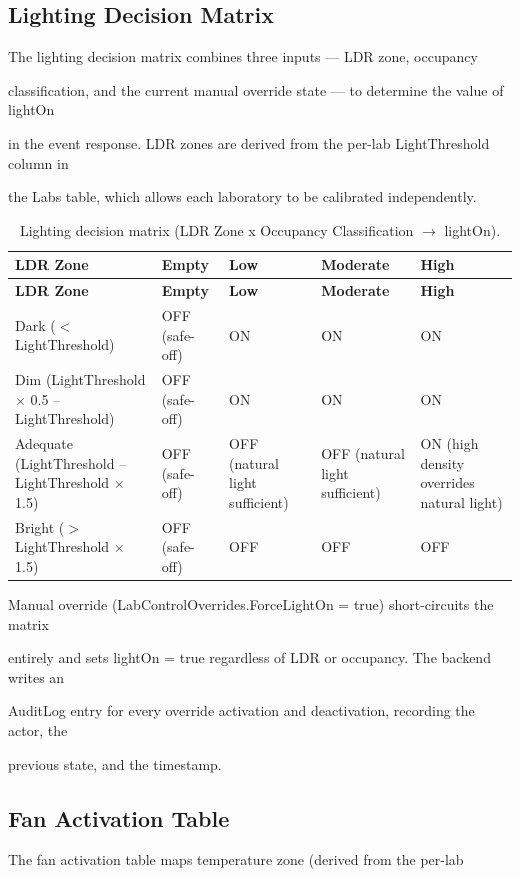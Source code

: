 \subsection{Lighting Decision Matrix}
The lighting decision matrix combines three inputs --- LDR zone, occupancy

classification, and the current manual override state --- to determine the value of lightOn

in the event response. LDR zones are derived from the per-lab LightThreshold column in

the Labs table, which allows each laboratory to be calibrated independently.

\begin{longtable}{|L{2.6cm}|L{2.0cm}|L{2.0cm}|L{2.0cm}|L{2.0cm}|}
\caption{Lighting decision matrix (LDR Zone x Occupancy Classification $\rightarrow$ lightOn).} \label{tab:4-6} \\
\hline
{}
\textbf{LDR Zone} & \textbf{Empty} & \textbf{Low} & \textbf{Moderate} & \textbf{High} \\
\hline
\endfirsthead
\hline
{}
\textbf{LDR Zone} & \textbf{Empty} & \textbf{Low} & \textbf{Moderate} & \textbf{High} \\
\hline
\endhead
\hline
\endfoot
\hline
\endlastfoot
Dark ($<$ LightThreshold) & OFF (safe-off) & ON & ON & ON \\
\hline
Dim (LightThreshold $\times$ 0.5 -- LightThreshold) & OFF (safe-off) & ON & ON & ON \\
\hline
Adequate (LightThreshold -- LightThreshold $\times$ 1.5) & OFF (safe-off) & OFF (natural light sufficient) & OFF (natural light sufficient) & ON (high density overrides natural light) \\
\hline
Bright ($>$ LightThreshold $\times$ 1.5) & OFF (safe-off) & OFF & OFF & OFF \\
\hline
\end{longtable}

Manual override (LabControlOverrides.ForceLightOn = true) short-circuits the matrix

entirely and sets lightOn = true regardless of LDR or occupancy. The backend writes an

AuditLog entry for every override activation and deactivation, recording the actor, the

previous state, and the timestamp.


\subsection{Fan Activation Table}
The fan activation table maps temperature zone (derived from the per-lab

